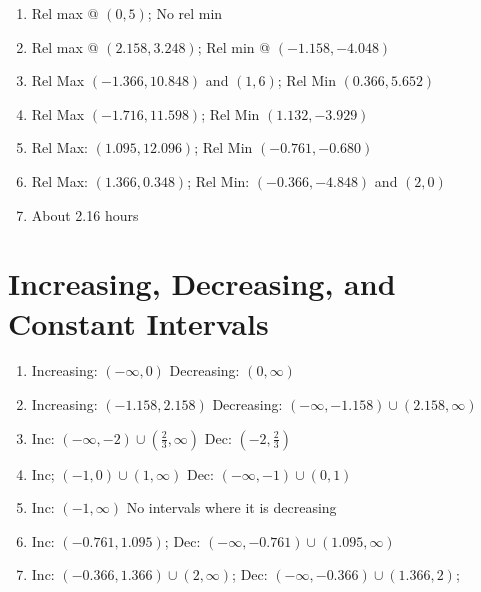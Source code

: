 \begin{enumerate}
	\item Rel max @ $(0,5)$; No rel min
	\item Rel max @ $(2.158, 3.248)$; Rel min @ $(-1.158, -4.048)$
	\item Rel Max $(-1.366,10.848)$ and $(1,6)$; \quad Rel Min $(0.366,5.652)$
    \item Rel Max $(-1.716,11.598)$; \quad Rel Min $(1.132,-3.929)$
    \item Rel Max: $(1.095, 12.096)$; \quad Rel Min $(-0.761, -0.680)$
    \item Rel Max: $(1.366, 0.348)$; \quad
    Rel Min: $(-0.366, -4.848)$ and $(2,0)$
	\item About 2.16 hours
\end{enumerate}

\section*{Increasing, Decreasing, and Constant Intervals}

\begin{enumerate}
	\item Increasing: $(-\infty, 0)$ \quad Decreasing: $(0, \infty)$
	\item Increasing: $(-1.158, 2.158)$ \quad Decreasing: $(-\infty, -1.158) \cup (2.158, \infty)$
    \item Inc: $(-\infty,-2) \cup \left(\frac{2}{3},\infty\right)$ \quad Dec: $\left(-2, \frac{2}{3}\right)$
    \item Inc; $(-1,0) \cup (1, \infty)$ \quad Dec: $(-\infty, -1) \cup (0,1)$
    \item Inc: $(-1,\infty)$ \quad No intervals where it is decreasing
    \item Inc: $(-0.761, 1.095)$; \quad Dec: $(-\infty, -0.761) \cup (1.095, \infty)$
    \item Inc: $(-0.366,1.366) \cup (2, \infty)$; \quad
    Dec: $(-\infty, -0.366) \cup (1.366,2)$;
\end{enumerate}


